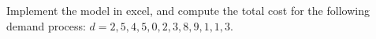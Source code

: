 \begin{exercise}
  Implement the model in excel, and compute the total cost for the
  following demand process: $d = 2, 5, 4, 5, 0, 2, 3, 8, 9, 1, 1, 3$.

\end{exercise}


